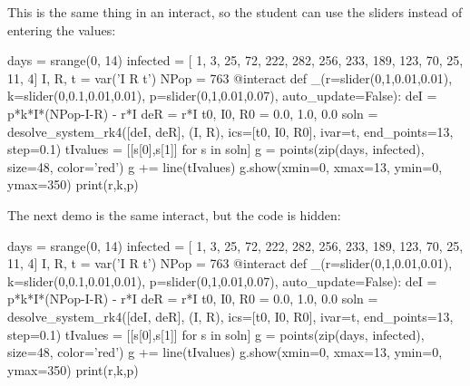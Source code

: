 \documentclass{ximera}
\begin{document}
This is the same thing in an interact, so the student can use the sliders instead of entering the values:
\begin{sageCell}
days = srange(0, 14)
infected = [  1,   3,  25, 72, 222, 282, 256, 
            233, 189, 123, 70,  25,  11,   4]
I, R, t = var('I R t')
NPop = 763
@interact
def _(r=slider(0,1,0.01,0.01),
      k=slider(0,0.1,0.01,0.01),
      p=slider(0,1,0.01,0.07),
      auto_update=False):
    deI = p*k*I*(NPop-I-R) - r*I
    deR = r*I
    t0, I0, R0 = 0.0, 1.0, 0.0
    soln = desolve_system_rk4([deI, deR], (I, R), 
                               ics=[t0, I0, R0], ivar=t,
                               end_points=13, step=0.1)
    tIvalues = [[s[0],s[1]] for s in soln]
    g = points(zip(days, infected), size=48, color='red')
    g += line(tIvalues)
    g.show(xmin=0, xmax=13, ymin=0, ymax=350)
    print(r,k,p)\end{sageCell}

The next demo is the same interact, but the code is hidden:

\begin{sageOutput}
days = srange(0, 14)
infected = [  1,   3,  25, 72, 222, 282, 256, 
            233, 189, 123, 70,  25,  11,   4]
I, R, t = var('I R t')
NPop = 763
@interact
def _(r=slider(0,1,0.01,0.01),
      k=slider(0,0.1,0.01,0.01),
      p=slider(0,1,0.01,0.07),
      auto_update=False):
    deI = p*k*I*(NPop-I-R) - r*I
    deR = r*I
    t0, I0, R0 = 0.0, 1.0, 0.0
    soln = desolve_system_rk4([deI, deR], (I, R), 
                               ics=[t0, I0, R0], ivar=t,
                               end_points=13, step=0.1)
    tIvalues = [[s[0],s[1]] for s in soln]
    g = points(zip(days, infected), size=48, color='red')
    g += line(tIvalues)
    g.show(xmin=0, xmax=13, ymin=0, ymax=350)
    print(r,k,p)
\end{sageOutput}
\end{document}
